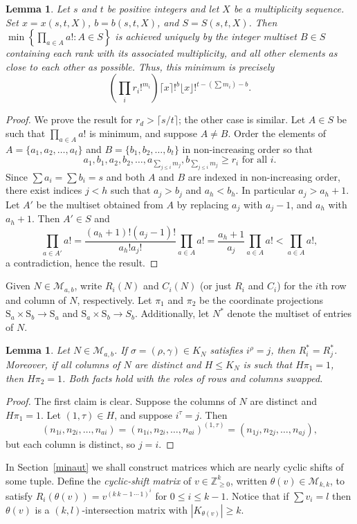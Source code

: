 \documentclass{daj}
\renewcommand\S{\mathrm{S}}
\newcommand\M{\mathcal{M}}
\theoremstyle{plain}
\newtheorem{lemma}[theorem]{Lemma}
\theoremstyle{definition}
\begin{document}
\begin{lemma}\label{minN}
Let $s$ and $t$ be positive integers and let $X$ be a multiplicity sequence. Set $x=x(s,t,X)$, $b=b(s,t,X)$, and $S=S(s,t,X)$. Then $\min\left\{\prod_{a\in A} a! : A\in S\right\}$ is achieved uniquely by the integer multiset $B\in S$ containing each rank with its associated multiplicity, and all other elements as close to each other as possible. Thus, this minimum is precisely $$\left(\prod_{i}r_i!^{m_i}\right)\lceil x\rceil!^b\lfloor x\rfloor!^{t-\left(\sum m_i\right)-b}.$$ 
\end{lemma}
\begin{proof}
We prove the result for $r_d>\lceil s/t\rceil$; the other case is similar. Let $A\in S$ be such that $\prod_{a\in A} a!$ is minimum, and suppose $A\ne B$. 
Order the elements of $A=\{a_1,a_2,\dots, a_t\}$ and $B=\{b_1,b_2,\dots, b_t\}$ in non-increasing order so that $$a_1,b_1,a_2,b_2,\dots ,a_{\sum_{j\leq i} m_j},b_{\sum_{j\leq i} m_j}\geq r_i\text{ for all $i$.}$$ Since $\sum a_i=\sum b_i=s$ and both $A$ and $B$ are indexed in non-increasing order, there exist indices $j<h$ such that $a_j>b_j$ and $a_h<b_h$. In particular $a_j>a_h+1$. Let $A'$ be the multiset obtained from $A$ by replacing $a_j$ with $a_j-1$, and $a_h$ with $a_h+1$. Then $A'\in S$ and $$\prod_{a\in A'} a!=\frac{(a_h+1)!(a_{j}-1)!}{a_h!a_j!}\prod_{a\in A} a!=\frac{a_h+1}{a_j}\prod_{a\in A} a!<\prod_{a\in A} a!,$$ a contradiction, hence the result.\end{proof}

Given $N\in \mathcal{M}_{a,b}$, write $R_i(N)$ and $C_i(N)$ (or just $R_i$ and $C_i$) for the $i$th row and column of $N$, respectively. Let $\pi_1$ and $\pi_2$ be the coordinate projections $\S_a\times \S_b\to \S_a$ and $\S_a\times \S_b\to S_b$. Additionally, let $N^*$ denote the multiset of entries of $N$.
\begin{lemma}\label{fixlem}
Let $N\in \mathcal{M}_{a,b}$. If $\sigma=(\rho,\gamma)\in K_N$ satisfies $i^{\rho}=j$, then $R_i^*=R_j^*$. Moreover, if all columns of $N$ are distinct and $H\leq K_N$ is such that $H\pi_1=1$, then $H\pi_2=1$. Both facts hold with the roles of rows and columns swapped.
\end{lemma}
\begin{proof}
The first claim is clear. Suppose the columns of $N$ are distinct and $H\pi_1=1$. Let $(1,\tau)\in H$, and suppose $i^{\tau}=j$. Then $$(n_{1i},n_{2i},\dots,n_{ai})=(n_{1i},n_{2i},\dots,n_{ai})^{(1,\tau)}=(n_{1j},n_{2j},\dots,n_{aj}),$$ but each column is distinct, so $j=i$.
\end{proof}
In Section~\ref{minaut} we shall construct matrices which are nearly cyclic shifts of some tuple. 
Define the \emph{cyclic-shift matrix} of $v\in\mathbb{Z}_{\geq 0}^k$, written $\theta(v)\in\M_{k,k}$, to satisfy $R_i(\theta(v))=v^{(k\,k-1\,\cdots\,1)^i}$ for $0\leq i\leq k-1$. Notice that if $\sum v_i=l$ then $\theta(v)$ is a $(k,l)$-intersection matrix with $|K_{\theta(v)}|\geq k$.
\end{document}

